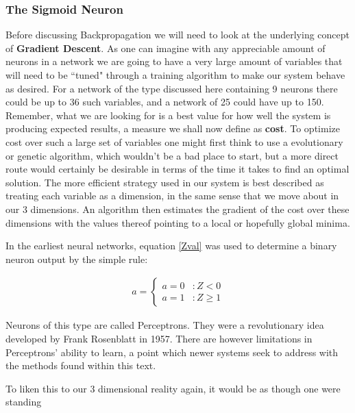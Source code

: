 \documentclass[a4paper,10pt]{article}
\newenvironment{funfact}[2][r]{
	\par
	\wrapfigure{#1}{0.5\textwidth}
		\begin{minipage}{0.48\textwidth}
			\vspace{-1em}
			\begin{tcolorbox}[
					left=1mm,
					right=1mm,
					top=.5mm,
					bottom=.5mm,
					boxsep=1mm,
					title=#2,
					fonttitle=\sffamily,
					colback=black!2!white,
					colbacktitle=black!75!,
					colframe=black!100!black,
					arc=0pt,
					outer arc=0pt ]
				\linespread{.95}
				\small
}
{
			\end{tcolorbox}
			\vspace{-1em}
		\end{minipage}	
	\endwrapfigure
}
\begin{document}
\subsubsection{The Sigmoid Neuron}

\setlength{\parskip}{0em} %
Before discussing Backpropagation we will need to look at the underlying concept of \textbf{Gradient Descent}.  As one
can imagine with any appreciable amount of neurons in a network we are going to have a very large amount of variables
that will need to be ``tuned" through a training algorithm to make our system behave as desired.  For a network of the
type discussed here containing 9 neurons there could be up to 36 such variables, and a network of 25 could have up to
150.  Remember, what we are looking for is a best value for how well the system is producing expected results, a measure
we shall now define as \textbf{cost}. To optimize cost over such a large set of variables one might first think to use
a evolutionary or genetic algorithm, which wouldn't be a bad place to start, but a more direct route would certainly be
desirable in terms of the time it takes to find an optimal solution.  The more efficient strategy used in our system is
best described as treating each variable as a dimension, in the same sense that we move about in our 3 dimensions.
An algorithm then estimates the gradient of the cost over these dimensions with the values thereof pointing to a local
or hopefully global minima.  
\begin{funfact}{On Perceptrons}
In the earliest neural networks, equation \ref{Zval} was used to determine a binary neuron output by the simple rule:

\begin{align*}
	a = \left\{
  		\begin{array}{lr} 
    		a = 0 & : Z <   0 \\
    		a = 1 & : Z \ge 1
  		\end{array}
	\right.
\end{align*} 

Neurons of this type are called Perceptrons. They were a revolutionary idea developed by Frank
Rosenblatt \cite{WikiFrankRosenblatt} in 1957. There are however limitations in Perceptrons' ability to learn, a point
which newer systems seek to address with the methods found within this text.

\end{funfact}  
\noindent
To liken this to our 3 dimensional reality again, it would be as though one were standing
\end{document}
